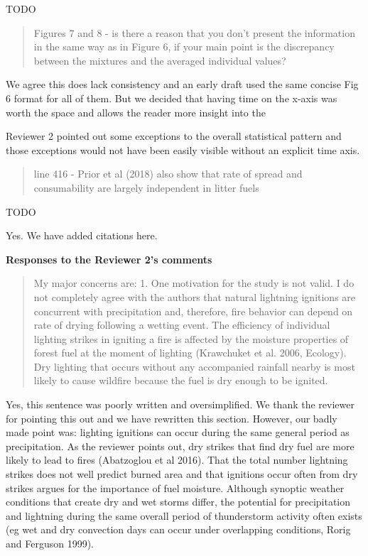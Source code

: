 \documentclass[letterpaper, 12pt]{letter}
\begin{document}
\begin{letter}{}
TODO


\begin{quote}
Figures 7 and 8 - is there a reason that you don't present the information in the same way as in Figure 6, if your main point is the discrepancy between the mixtures and the averaged individual values?
\end{quote}

We agree this does lack consistency and an early draft used the same concise Fig 6 format for all of them. But we decided that having time on the x-axis was worth the space and allows the reader more insight into the

Reviewer 2 pointed out some exceptions to the overall statistical pattern and those exceptions would not have been easily visible without an explicit time axis.


\begin{quote}
line 416 - Prior et al (2018) also show that rate of spread and consumability are largely independent in litter fuels
\end{quote}

TODO

Yes. We have added citations here.



{\bf Responses to the Reviewer 2's comments}

\begin{quote}

My major concerns are:
1. One motivation for the study is not valid. I do not completely agree with the authors that natural lightning ignitions are concurrent with precipitation and, therefore, fire behavior can depend on rate of drying following a wetting event. The efficiency of individual lighting strikes in igniting a fire is affected by the moisture properties of forest fuel at the moment of lighting (Krawchuket et al. 2006, Ecology). Dry lighting that occurs without any accompanied rainfall nearby is most likely to cause wildfire because the fuel is dry enough to be ignited.
\end{quote}

Yes, this sentence was poorly written and oversimplified. We thank the reviewer
for pointing this out and we have rewritten this section. However, our badly
made point was: lighting ignitions can occur during the same general period as
precipitation. As the reviewer points out, dry strikes that find dry fuel are
more likely to lead to fires (Abatzoglou et al 2016). That the total number
lightning strikes does not well predict burned area and that ignitions occur
often from dry strikes argues for the importance of fuel moisture. Although
synoptic weather conditions that create dry and wet storms differ, the
potential for precipitation and lightning during the same overall period of
thunderstorm activity often exists (eg wet and dry convection days can occur
under overlapping conditions, Rorig and Ferguson 1999).




\end{letter}
\end{document}
